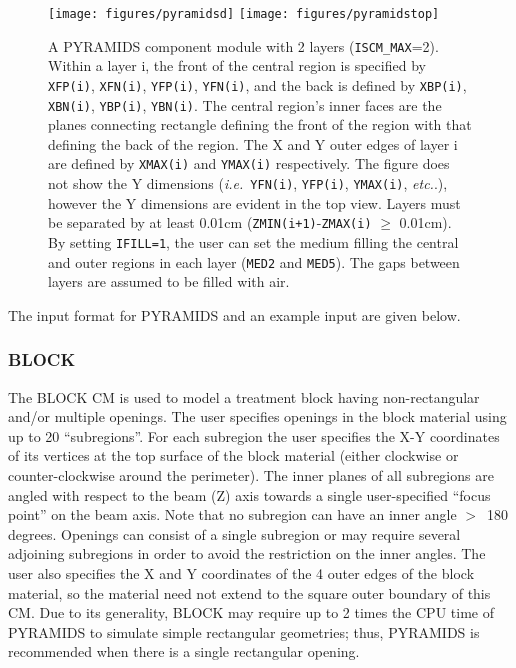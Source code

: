 \documentclass[12pt,twoside]{article}
\newcommand{\ie}{{\em i.e.}}
\newcommand{\etc}{{\em etc.}}
\begin{document}
\begin{figure}[htp]
\leavevmode
\hfill
\texttt{[image: figures/pyramidsd]}
\vspace{0.1cm}
\texttt{[image: figures/pyramidstop]}
\caption[PYRAMIDS CM geometry]
{A PYRAMIDS component module with 2 layers ({\tt ISCM\_MAX}=2).  Within a
layer i, the front of the central region is specified by
{\tt XFP(i)}, {\tt XFN(i)}, {\tt YFP(i)}, {\tt YFN(i)}, and the back
is defined by {\tt XBP(i)}, {\tt XBN(i)}, {\tt YBP(i)},
{\tt YBN(i)}.
The central region's inner faces are the planes connecting rectangle
defining the front of the region with that defining the back of the region.
The X and Y outer edges of
layer i are defined by {\tt XMAX(i)} and {\tt YMAX(i)} respectively.
The figure does
not show the Y dimensions (\ie\ {\tt YFN(i)}, {\tt YFP(i)}, {\tt YMAX(i)}, \etc.),
however the Y
dimensions are evident in the top view.  Layers must be separated by at
least 0.01cm ({\tt ZMIN(i+1)}-{\tt ZMAX(i)} $\geq$ 0.01cm).  By setting
{\tt IFILL=1},
the user can set the medium filling the central and outer regions
in each layer ({\tt MED2} and {\tt MED5}).  The gaps
between layers are assumed to be filled with air.}
\label{fig_PYRAMIDSD}
\end{figure}


\clearpage
The input format for PYRAMIDS and an example input are given below.
\begin{small}

\end{small}


\clearpage


\subsubsection{BLOCK}
\renewcommand{\rightmark}{BLOCK CM}
The BLOCK CM is used to model a treatment block having non-rectangular
and/or multiple openings.  The user specifies openings in the block
material using up to 20 ``subregions''.  For each subregion the user
specifies the X-Y coordinates of its vertices at the top surface of the
block material (either clockwise or counter-clockwise around the
perimeter).  The inner planes of all subregions are angled with respect to
the beam (Z) axis towards a single user-specified ``focus point'' on the
beam axis.  Note that no subregion can have an inner
angle $>$~180 degrees.
Openings can consist of a single subregion or may require
several adjoining subregions in order to avoid the restriction on the inner
angles.
The user also specifies the X and Y coordinates
of the 4 outer edges of the block material, so the material need not
extend to the square outer boundary of this CM.  Due to its generality,
BLOCK may require up to 2 times the CPU time of PYRAMIDS to simulate
simple rectangular geometries; thus, PYRAMIDS is recommended when there is
a single rectangular opening.
\end{document}
